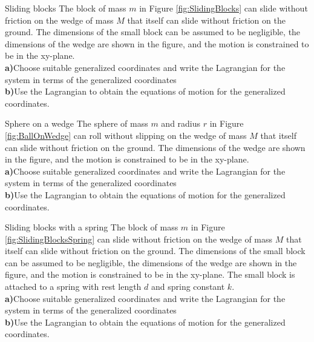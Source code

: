 \begin{problem}{Sliding blocks}
The block of mass $m$ in Figure \ref{fig:SlidingBlocks} can slide without friction on the wedge of mass $M$ that itself can slide without friction on the ground. The dimensions of the small block can be assumed to be negligible, the dimensions of the wedge are shown in the figure, and the motion is constrained to be in the xy-plane.
\\
\textbf{a)}Choose suitable generalized coordinates and write the Lagrangian for the system in terms of the generalized coordinates\\
\textbf{b)}Use the Lagrangian to obtain the equations of motion for the generalized coordinates.
\label{prob_Lagrange_9}
\end{problem}

\begin{problem}{Sphere on a wedge}
The sphere of mass $m$ and radius $r$ in Figure \ref{fig:BallOnWedge} can roll without slipping on the wedge of mass $M$ that itself can slide without friction on the ground. The dimensions of the wedge are shown in the figure, and the motion is constrained to be in the xy-plane.
\\
\textbf{a)}Choose suitable generalized coordinates and write the Lagrangian for the system in terms of the generalized coordinates\\
\textbf{b)}Use the Lagrangian to obtain the equations of motion for the generalized coordinates.
\label{prob_Lagrange_10}
\end{problem}

\begin{problem}{Sliding blocks with a spring}
The block of mass $m$ in Figure \ref{fig:SlidingBlocksSpring} can slide without friction on the wedge of mass $M$ that itself can slide without friction on the ground. The dimensions of the small block can be assumed to be negligible, the dimensions of the wedge are shown in the figure, and the motion is constrained to be in the xy-plane. The small block is attached to a spring with rest length $d$ and spring constant $k$.
\\
\textbf{a)}Choose suitable generalized coordinates and write the Lagrangian for the system in terms of the generalized coordinates\\
\textbf{b)}Use the Lagrangian to obtain the equations of motion for the generalized coordinates.
\label{prob_Lagrange_11}
\end{problem}

